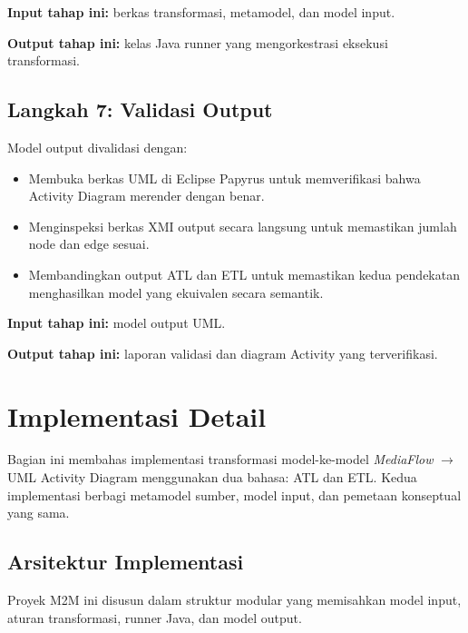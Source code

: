 \textbf{Input tahap ini:} berkas transformasi, metamodel, dan model input.

\textbf{Output tahap ini:} kelas Java runner yang mengorkestrasi eksekusi transformasi.

\subsection{Langkah 7: Validasi Output}

Model output divalidasi dengan:
\begin{itemize}
  \item Membuka berkas UML di Eclipse Papyrus untuk memverifikasi bahwa Activity Diagram merender dengan benar.
  \item Menginspeksi berkas XMI output secara langsung untuk memastikan jumlah node dan edge sesuai.
  \item Membandingkan output ATL dan ETL untuk memastikan kedua pendekatan menghasilkan model yang ekuivalen secara semantik.
\end{itemize}

\textbf{Input tahap ini:} model output UML.

\textbf{Output tahap ini:} laporan validasi dan diagram Activity yang terverifikasi.

\section{Implementasi Detail}

Bagian ini membahas implementasi transformasi model-ke-model \textit{MediaFlow} $\rightarrow$ UML Activity Diagram menggunakan dua bahasa: ATL dan ETL. Kedua implementasi berbagi metamodel sumber, model input, dan pemetaan konseptual yang sama.

\subsection{Arsitektur Implementasi}

Proyek M2M ini disusun dalam struktur modular yang memisahkan model input, aturan transformasi, runner Java, dan model output.

